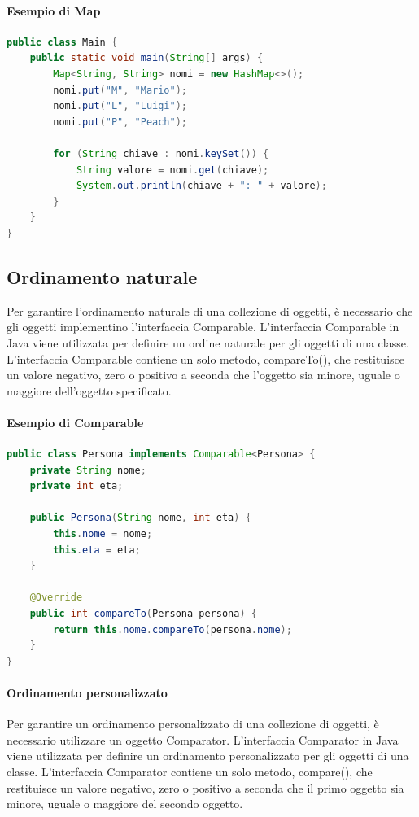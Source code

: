\documentclass[11pt]{article}
\begin{document}
\paragraph{Esempio di Map}
\begin{lstlisting}[language=Java]
public class Main {
    public static void main(String[] args) {
        Map<String, String> nomi = new HashMap<>();
        nomi.put("M", "Mario");
        nomi.put("L", "Luigi");
        nomi.put("P", "Peach");

        for (String chiave : nomi.keySet()) {
            String valore = nomi.get(chiave);
            System.out.println(chiave + ": " + valore);
        }
    }
}
\end{lstlisting}
\subsection{Ordinamento naturale}
Per garantire l'ordinamento naturale di una collezione di oggetti, è necessario che gli oggetti implementino l'interfaccia Comparable.
L'interfaccia Comparable in Java viene utilizzata per definire un ordine naturale per gli oggetti di una classe.
L'interfaccia Comparable contiene un solo metodo, compareTo(), che restituisce un valore negativo, zero o positivo a seconda che l'oggetto sia minore, uguale o maggiore dell'oggetto specificato.
\paragraph{Esempio di Comparable}
\begin{lstlisting}[language=Java]
public class Persona implements Comparable<Persona> {
    private String nome;
    private int eta;

    public Persona(String nome, int eta) {
        this.nome = nome;
        this.eta = eta;
    }

    @Override
    public int compareTo(Persona persona) {
        return this.nome.compareTo(persona.nome);
    }
}
\end{lstlisting}
\paragraph{Ordinamento personalizzato}
Per garantire un ordinamento personalizzato di una collezione di oggetti, è necessario utilizzare un oggetto Comparator.
L'interfaccia Comparator in Java viene utilizzata per definire un ordinamento personalizzato per gli oggetti di una classe.
L'interfaccia Comparator contiene un solo metodo, compare(), che restituisce un valore negativo, zero o positivo a seconda che il primo oggetto sia minore, uguale o maggiore del secondo oggetto.
\end{document}
